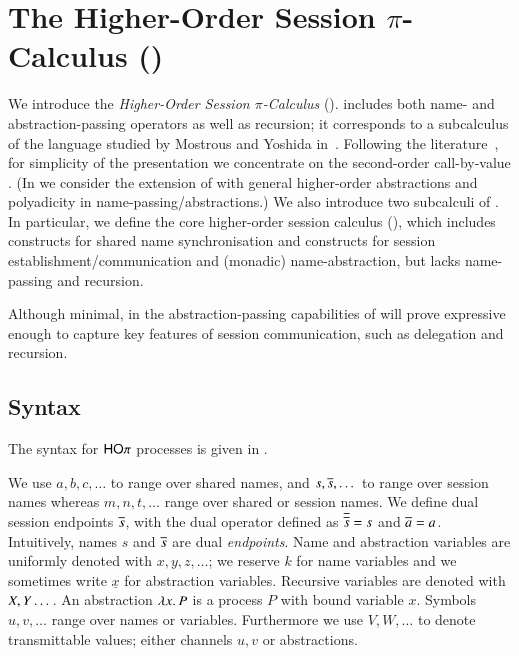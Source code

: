 
\section{The Higher-Order Session $\pi$-Calculus (\HOp)}
\label{sec:calculus}

We introduce the 
\emph{Higher-Order Session $\pi$-Calculus} (\HOp).
\HOp includes both name- and abstraction-passing operators
as well as recursion; it corresponds to a subcalculus 
of the language
studied by Mostrous and Yoshida in~\cite{tlca07,MostrousY15}. 
Following the literature~\cite{JeffreyR05},
for simplicity of the presentation
we concentrate on the second-order call-by-value \HOp.  
(In  we consider the extension of 
\HOp with general higher-order abstractions 
and polyadicity in name-passing/abstractions.)
We also introduce two subcalculi of \HOp.
In particular, we define the 
core higher-order session
calculus (\HO), which 
includes constructs for shared name synchronisation and 
constructs for session establish\-ment/communication and 
(monadic) name-abstraction, but lacks name-passing and recursion.

Although minimal, in 
the abstraction-passing capabilities of \HOp will prove 
expressive enough to capture key features of session communication, 
such as delegation and recursion.

\subsection{Syntax} 

The syntax for $\mathsf{HO}\pi$ processes is given in .

We use $a,b,c, \dots$ to range over shared names, and
$s, \overline{s}, \dots$ to range over session names
whereas $m, n, t, \dots$ range over shared or session names.
We define dual session endpoints $\overline{s}$,
with the dual operator defined as
$\overline{\overline{s}} = s$ and $\overline{a} = a$.
Intuitively, names $s$ and $\overline{s}$ are dual  \emph{endpoints}.
Name and abstraction variables are uniformly denoted with $x, y, z, \dots$;
we reserve $k$ for name variables and we sometimes write $\underline{x}$ for abstraction variables.
Recursive variables are denoted with $X, Y \dots$.
An abstraction $\lambda x.\,P$ is a process $P$ with bound variable $x$.
Symbols $u, v, \dots$ range over names or variables. Furthermore
we use $V, W, \dots$ to denote transmittable values; either channels $u, v$ or
abstractions.

